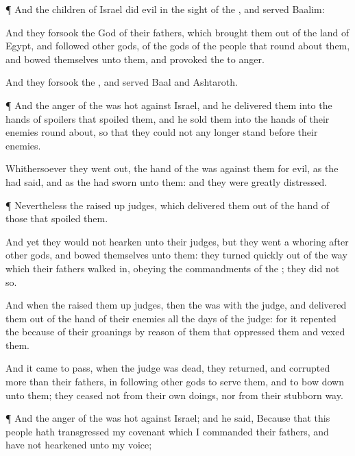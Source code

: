 {\par }{\PP {}¶ And the
children of
Israel
did
evil in the
sight of the
{}, and
served
Baalim:

And they
forsook the
{}
God of their
fathers, which brought them
out of the
land of
Egypt, and
followed
other
gods, of the
gods of the
people that
{} round
about them, and
bowed themselves unto them, and provoked the
{} to
anger.

And they
forsook the
{}, and
served
Baal and
Ashtaroth.


\par }{\PP {}¶ And the
anger of the
{} was
hot against
Israel, and he
delivered them into the
hands of
spoilers that
spoiled them, and he
sold them into the
hands of their
enemies round
about, so that they
could not any
longer
stand
before their
enemies.

Whithersoever they went
out, the
hand of the
{} was against them for
evil, as the
{} had
said, and as the
{} had
sworn unto them: and they were
greatly
distressed.


\par }{\PP {}¶ Nevertheless the
{} raised
up
judges, which
delivered them out of the
hand of those that
spoiled them.

And yet they would not
hearken unto their
judges, but they went a
whoring
after
other
gods, and
bowed themselves unto them: they
turned
quickly out of the
way which their
fathers walked
in,
obeying the
commandments of the
{};
{} they
did not so.

And when the
{}
raised them up
judges, then the
{} was with the
judge, and
delivered them out of the
hand of their
enemies all the
days of the
judge: for it
repented the
{}
because of their
groanings by reason of them that
oppressed them and
vexed them.

And it came to pass, when the
judge was
dead,
{} they
returned, and
corrupted
{} more than their
fathers, in
following
other
gods to
serve them, and to bow
down unto them; they
ceased not from their own
doings, nor from their
stubborn
way.


\par }{\PP {}¶ And the
anger of the
{} was
hot against
Israel; and he
said, Because that this
people hath
transgressed my
covenant which I
commanded their
fathers, and have not
hearkened unto my
voice;

}
